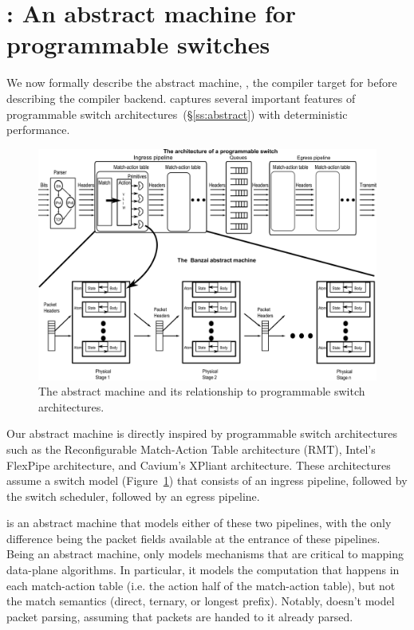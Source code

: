 \section{\absmachine: An abstract machine for programmable switches}
\label{s:absmachine}

We now formally describe the abstract machine, \textit{\absmachine}, the
compiler target for \pktlanguage before describing the compiler backend.
\absmachine captures several important features of programmable switch
architectures~(\S\ref{ss:abstract}) with deterministic performance.

\begin{figure}[!t]
  \includegraphics[width=\textwidth]{banzai.pdf}
  \caption{The \absmachine abstract machine and its relationship to programmable switch architectures.}
  \label{fig:switch}
\end{figure}
Our abstract machine is directly inspired by programmable switch architectures
such as the Reconfigurable Match-Action Table architecture (RMT), Intel's
FlexPipe architecture, and Cavium's XPliant architecture. These architectures
assume a switch model (Figure~\ref{fig:switch}) that consists of an ingress
pipeline, followed by the switch scheduler, followed by an egress pipeline.

\absmachine is an abstract machine that models either of these two pipelines,
with the only difference being the packet fields available at the entrance of
these pipelines. Being an abstract machine, \absmachine only models mechanisms
that are critical to mapping data-plane algorithms. In particular, it models
the computation that happens in each match-action table (i.e. the action half
of the match-action table), but not the match semantics (direct, ternary, or
longest prefix). Notably, \absmachine doesn't model packet parsing, assuming
that packets are handed to it already parsed.

